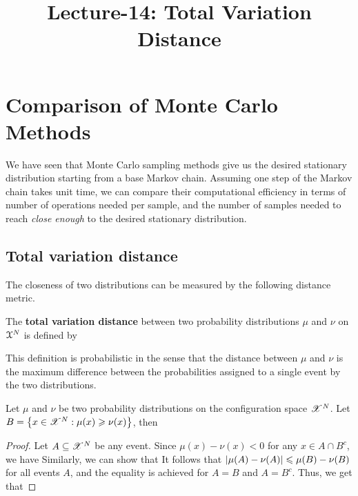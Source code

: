 \documentclass[letterpaper,english,10pt]{article}
\title{Lecture-14: Total Variation Distance}
\begin{document}
\maketitle

\section{Comparison of Monte Carlo Methods}
We have seen that Monte Carlo sampling methods give us the desired stationary distribution starting from a base Markov chain. 
Assuming one step of the Markov chain takes unit time, 
we can compare their computational efficiency in terms of number of operations needed per sample,  
and the number of samples needed to reach \textit{close enough} to the desired stationary distribution. 

\subsection{Total variation distance}
The closeness of two distributions can be measured by the following distance metric.
\begin{defn}
The \textbf{total variation distance} between two probability distributions $\mu$ and $\nu$ on $\mathcal{X}^N$ is defined by
\end{defn}
This definition is probabilistic in the sense that the distance between $\mu$ and $\nu$ is the maximum difference between the probabilities assigned to a single event by the two distributions. 
\begin{prop}
\label{prop:equivalenceOfTvDefinitions}
Let $\mu$ and $\nu$ be two probability distributions on the configuration space $\mathscr{X}^N$. 
Let $B = \left\{x \in \mathscr{X}^N: \mu(x) \geqslant \nu(x)\right\}$, then 
\end{prop}
\begin{proof}
Let $A \subseteq \mathscr{X}^N$ be any event. 
Since $\mu(x)  - \nu(x) < 0$ for any $x \in A\cap B^c$, we have 
Similarly, we can show that 
It follows that $\left\lvert\mu(A)-\nu(A)\right\rvert \leqslant  \mu(B) - \nu(B)$ for all events $A$, 
and the equality is achieved for $A = B$ and $A = B^c$. 
Thus, we get that 
\end{proof}
\end{document}
